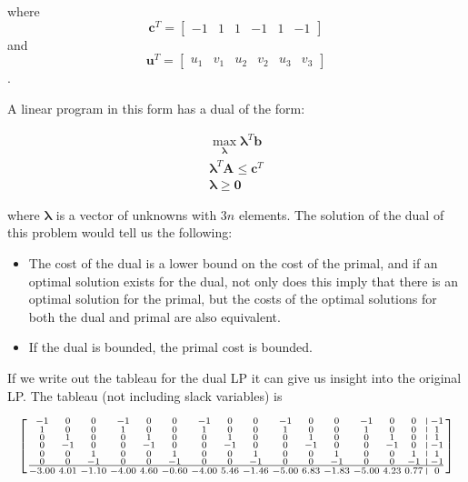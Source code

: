 \documentclass{article}
\begin{document}
\noindent where \[\mathbf{c}^T = \begin{bmatrix}-1 & 1 & 1 & -1 & 1 & -1\end{bmatrix}\] and \[\mathbf{u}^T = \begin{bmatrix}u_1 & v_1 & u_2 & v_2 & u_3 & v_3\end{bmatrix}\].

\noindent A linear program in this form has a dual of the form:

\begin{eqnarray*}
	\max_{\boldsymbol{\lambda}} \boldsymbol{\lambda}^T \mathbf{b}\\
	\boldsymbol{\lambda}^T \mathbf{A} \le \mathbf{c}^T\\
	\boldsymbol{\lambda} \ge \mathbf{0}
\end{eqnarray*}

\noindent where $\boldsymbol{\lambda}$ is a vector of unknowns with $3n$ elements.
The solution of the dual of this problem would tell us the following:

\begin{itemize}
	\item The cost of the dual is a lower bound on the cost of the primal, and if an optimal solution exists for the dual, not only does this imply that there is an optimal solution for the primal, but the costs of the optimal solutions for both the dual and primal are also equivalent.
	\item If the dual is bounded, the primal cost is bounded.
\end{itemize}

If we write out the tableau for the dual LP it can give us insight into the original LP.
The tableau (not including slack variables) is

\begin{equation*}
\left[ \begin{smallmatrix}
-1 & 0 & 0 & -1 & 0 & 0 & -1 & 0 & 0 & -1 & 0 & 0 & -1 & 0 & 0 & \vline & -1\\
1 & 0 & 0 & 1 & 0 & 0 & 1 & 0 & 0 & 1 & 0 & 0 & 1 & 0 & 0 & \vline & 1\\
0 & 1 & 0 & 0 & 1 & 0 & 0 & 1 & 0 & 0 & 1 & 0 & 0 & 1 & 0 & \vline & 1\\
0 & -1 & 0 & 0 & -1 & 0 & 0 & -1 & 0 & 0 & -1 & 0 & 0 & -1 & 0 & \vline & -1\\
0 & 0 & 1 & 0 & 0 & 1 & 0 & 0 & 1 & 0 & 0 & 1 & 0 & 0 & 1 & \vline & 1\\
0 & 0 & -1 & 0 & 0 & -1 & 0 & 0 & -1 & 0 & 0 & -1 & 0 & 0 & -1 & \vline & -1\\
\hline \\
-3.00 & 4.01 & -1.10 & -4.00 & 4.60 & -0.60 & -4.00 & 5.46 & -1.46 & -5.00 & 6.83 & -1.83 & -5.00 & 4.23 & 0.77 & \vline & 0\\
\end{smallmatrix} \right]
\end{equation*}
\end{document}
